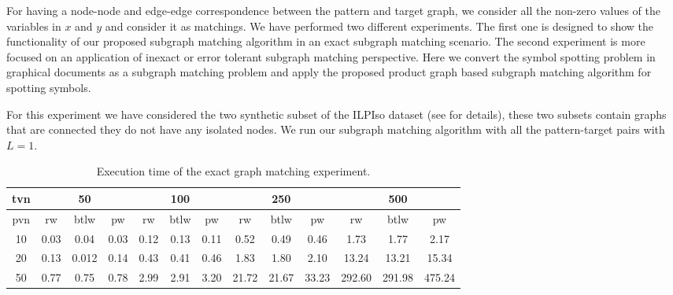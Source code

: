 For having a node-node and edge-edge correspondence between the pattern and target graph, we consider all the non-zero values of the variables in $x$ and $y$ and consider it as matchings.
We have performed two different experiments. The first one is designed to show the functionality of our proposed subgraph matching algorithm in an exact subgraph matching scenario. The second experiment is more focused on an application of inexact or error tolerant subgraph matching perspective. Here we convert the symbol spotting problem in graphical documents as a subgraph matching problem and apply the proposed product graph based subgraph matching algorithm for spotting symbols.

For this experiment we have considered the two synthetic subset of the ILPIso dataset (see  for details), these two subsets contain graphs that are connected \ie they do not have any isolated nodes. We run our subgraph matching algorithm with all the pattern-target pairs with $L=1$.

\begin{table}
\scriptsize
\caption{Execution time of the exact graph matching experiment.}
\begin{tabular}{c|cccccccccccc}
\toprule
tvn & \multicolumn{3}{c}{50} & \multicolumn{3}{c}{100} & \multicolumn{3}{c}{250} & \multicolumn{3}{c}{500}\\\hline
pvn &  rw  & btlw &  pw  &  rw  & btlw &  pw  &   rw  & btlw  &   pw  &   rw   &  btlw  &  pw  \\
10  & 0.03 & 0.04 & 0.03 & 0.12 & 0.13 & 0.11 &  0.52 &  0.49 &  0.46 &   1.73 &   1.77 &  2.17\\
20  & 0.13 & 0.012& 0.14 & 0.43 & 0.41 & 0.46 &  1.83 &  1.80 &  2.10 &  13.24 &  13.21 & 15.34\\
50  & 0.77 & 0.75 & 0.78 & 2.99 & 2.91 & 3.20 & 21.72 & 21.67 & 33.23 & 292.60 & 291.98 &475.24\\
\hline
\end{tabular}
\label{table:pg:time-comp}
\end{table}

